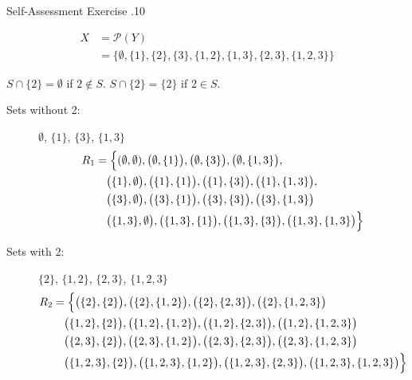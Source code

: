\documentclass[../notes.tex]{subfiles}
\begin{document}
\begin{exercise}{Self-Assessment Exercise \thechapter.10}
\begin{enumerate}
\begin{enumerate}[label=(\alph*)]
									\begin{align*}
										X &= \mathcal{P}(Y)\\
										&= \bigl\{\emptyset, \{1\}, \{2\}, \{3\}, \{1, 2\}, \{1, 3\}, \{2, 3\}, \{1, 2, 3\}\bigr\}
									\end{align*}
									\begin{center}
										$S \cap \{2\} = \emptyset$ if $2 \notin S$. \qquad $S \cap \{2\} = \{2\}$ if $2 \in S$.
									\end{center}
									\begin{description}
										\item[Sets without 2:] $\emptyset$, $\{1\}$, $\{3\}$, $\{1, 3\}$
											\begin{align*}
												R_{1} &= \Bigl\{(\emptyset, \emptyset), \bigl(\emptyset, \{1\}\bigr), \bigl(\emptyset, \{3\}\bigr), \bigl(\emptyset, \{1, 3\}\bigr), \\
												& \quad \bigl(\{1\}, \emptyset\bigr), \bigl(\{1\}, \{1\}\bigr), \bigl(\{1\}, \{3\}\bigr), \bigl(\{1\}, \{1, 3\}\bigr),\\
												& \quad \bigl(\{3\}, \emptyset\bigr), \bigl(\{3\}, \{1\}\bigr), \bigl(\{3\}, \{3\}\bigr), \bigl(\{3\}, \{1, 3\}\bigr)\\
												& \quad \bigl(\{1, 3\}, \emptyset\bigr), \bigl(\{1, 3\}, \{1\}\bigr), \bigl(\{1, 3\}, \{3\}\bigr), \bigl(\{1, 3\}, \{1, 3\}\bigr)\Bigr\}
											\end{align*}
										\item[Sets with 2:] $\{2\}$, $\{1, 2\}$, $\{2, 3\}$, $\{1, 2, 3\}$
											\begin{align*}
												R_{2} &= \Bigl\{\bigl(\{2\}, \{2\}\bigr), \bigl(\{2\}, \{1, 2\}\bigr), \bigl(\{2\}, \{2, 3\}\bigr), \bigl(\{2\}, \{1, 2, 3\}\bigr)\\
												& \quad \bigl(\{1, 2\}, \{2\}\bigr), \bigl(\{1, 2\}, \{1, 2\}\bigr), \bigl(\{1, 2\}, \{2, 3\}\bigr), \bigl(\{1, 2\}, \{1, 2, 3\}\bigr)\\
												& \quad \bigl(\{2, 3\}, \{2\}\bigr), \bigl(\{2, 3\}, \{1, 2\}\bigr), \bigl(\{2, 3\}, \{2, 3\}\bigr), \bigl(\{2, 3\}, \{1, 2, 3\}\bigr)\\
												& \quad \bigl(\{1, 2, 3\}, \{2\}\bigr), \bigl(\{1, 2, 3\}, \{1, 2\}\bigr), \bigl(\{1, 2, 3\}, \{2, 3\}\bigr), \bigl(\{1, 2, 3\}, \{1, 2, 3\}\bigr)\Bigr\}
											\end{align*}
									\end{description}
									\begin{description}

\end{description}
\end{enumerate}
\end{enumerate}
\end{exercise}
\end{document}
